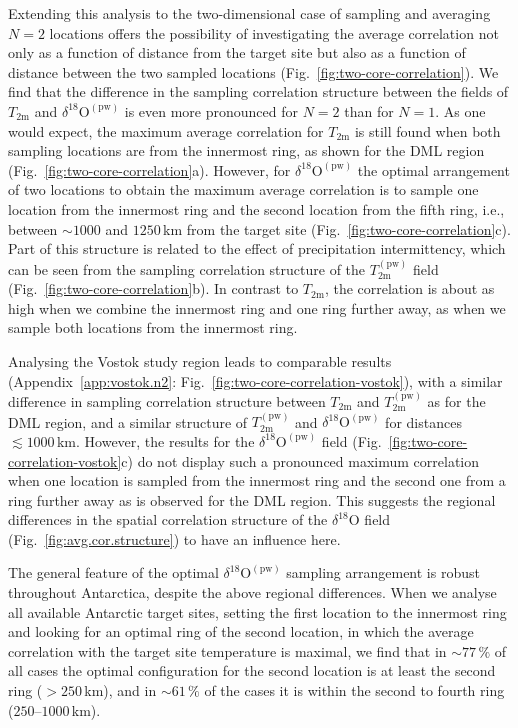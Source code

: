 \documentclass[draft]{agujournal2019}
\begin{document}
Extending this analysis to the two-dimensional case of sampling and averaging
$N=2$ locations offers the possibility of investigating the average correlation
not only as a function of distance from the target site but also as a function
of distance between the two sampled locations
(Fig.~\ref{fig:two-core-correlation}). We find that the difference in the
sampling correlation structure between the fields of $T_{\mathrm{2m}}$ and
$\delta^{18}\mathrm{O}^{\mathrm{(pw)}}$ is even more pronounced for $N=2$ than
for $N=1$. As one would expect, the maximum average correlation for
$T_{\mathrm{2m}}$ is still found when both sampling locations are from the
innermost ring, as shown for the DML region
(Fig.~\ref{fig:two-core-correlation}a). However, for
$\delta^{18}\mathrm{O}^{\mathrm{(pw)}}$ the optimal arrangement of two locations
to obtain the maximum average correlation is to sample one location from the
innermost ring and the second location from the fifth ring, i.e., between
$\sim1000$ and $1250$\,km from the target site
(Fig.~\ref{fig:two-core-correlation}c). Part of this structure is related to the
effect of precipitation intermittency, which can be seen from the sampling
correlation structure of the $T_{\mathrm{2m}}^{\mathrm{(pw)}}$ field
(Fig.~\ref{fig:two-core-correlation}b). In contrast to $T_{\mathrm{2m}}$, the
correlation is about as high when we combine the innermost ring and one ring
further away, as when we sample both locations from the innermost ring.

Analysing the Vostok study region leads to comparable results
(Appendix~\ref{app:vostok.n2}: Fig.~\ref{fig:two-core-correlation-vostok}), with
a similar difference in sampling correlation structure between $T_{\mathrm{2m}}$
and $T_{\mathrm{2m}}^{\mathrm{(pw)}}$ as for the DML region, and a similar
structure of $T_{\mathrm{2m}}^{\mathrm{(pw)}}$ and
$\delta^{18}\mathrm{O}^{\mathrm{(pw)}}$ for distances $\lesssim1000$\,km.
However, the results for the $\delta^{18}\mathrm{O}^{\mathrm{(pw)}}$ field
(Fig.~\ref{fig:two-core-correlation-vostok}c) do not display such a pronounced
maximum correlation when one location is sampled from the innermost ring and the
second one from a ring further away as is observed for the DML region. This
suggests the regional differences in the spatial correlation structure of the
$\delta^{18}\mathrm{O}$ field (Fig.~\ref{fig:avg.cor.structure}) to have an
influence here.

The general feature of the optimal $\delta^{18}\mathrm{O}^{\mathrm{(pw)}}$
sampling arrangement is robust throughout Antarctica, despite the above regional
differences. When we analyse all available Antarctic target sites, setting the
first location to the innermost ring and looking for an optimal ring of the
second location, in which the average correlation with the target site
temperature is maximal, we find that in $\sim77\,\%$ of all cases the optimal
configuration for the second location is at least the second ring ($>250$\,km),
and in $\sim61\,\%$ of the cases it is within the second to fourth ring
($250$--$1000$\,km).
\end{document}

